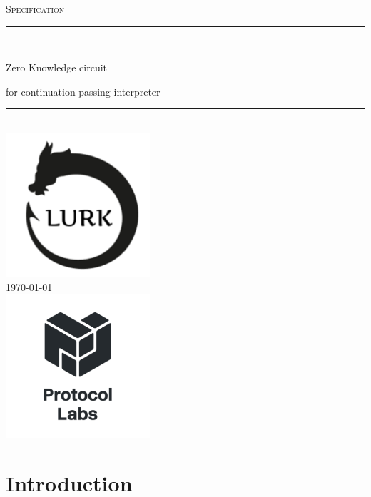 \documentclass[10pt, english]{article}
\begin{document}
\begin{titlepage}
	\newcommand{\HRule}{\rule{\linewidth}{0.5mm}}

	\clearpage\thispagestyle{empty}
	\centering
	\vspace{1cm}

	\textsc{\Large Specification}\\[.5cm]
	\HRule\\[.5cm]
	{\Huge Zero Knowledge circuit \par}
	\vspace{.5cm}
	{\Large for continuation-passing interpreter \par}
	\vspace{.5cm}
	\HRule \\[.5cm]


\includegraphics[width=0.4\textwidth,scale=1]{logo.png}\\[.1cm]
	{\large \today}\\[2cm]
\includegraphics[width=0.4\textwidth,scale=2]{pl.jpg}\\[.1cm]
\vfill
\end{titlepage}


\begin{abstract}
  \end{abstract}

\tableofcontents

\newpage

\section{Introduction}
\end{document}

